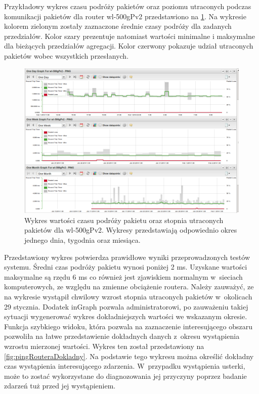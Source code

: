 Przykładowy wykres czasu podróży pakietów oraz poziomu utraconych
podczas komunikacji pakietów dla router wl-500gPv2 przedstawiono na
\ref{fig:pingRoutera}. Na wykresie kolorem zielonym zostały zaznaczone
średnie czasy podróży dla zadanych przedziałów. Kolor szary prezentuje
natomiast wartości minimalne i maksymalne dla bieżących przedziałów
agregacji. Kolor czerwony pokazuje udział utraconych pakietów wobec
wszystkich przesłanych.

\begin{figure}[ht]
  \caption{Wykres wartości czasu podróży pakietu oraz stopnia
    utraconych pakietów dla wl-500gPv2. Wykresy przedstawiają
    odpowiednio okres jednego dnia, tygodnia oraz miesiąca.}
  \label{fig:pingRoutera}
  \centering
\includegraphics[width=1\textwidth]{img/pingRoutera.png}
\end{figure}

Przedstawiony wykres potwierdza prawidłowe wyniki przeprowadzonych
testów systemu. Średni czas podróży pakietu wynosi poniżej 2
ms. Uzyskane wartości maksymalne są rzędu 6 ms co również jest
zjawiskiem normalnym w~sieciach komputerowych, ze względu na zmienne
obciążenie routera. Należy zauważyć, ze na wykresie wystąpił chwilowy
wzrost stopnia utraconych pakietów w~okolicach 29 stycznia. Dodatek
inGraph pozwala administratorowi, po zauważeniu takiej sytuacji
wygenerować wykres dokładniejszych wartości we wskazanym
okresie. Funkcja szybkiego widoku, która pozwala na zaznaczenie
interesującego obszaru pozwoliła na łatwe przedstawienie dokładnych
danych z~okresu wystąpienia wzrostu mierzonej wartości. Wykres ten
został przedstawiony na \ref{fig:pingRouteraDokladny}. Na podstawie
tego wykresu można określić dokładny czas wystąpienia interesującego
zdarzenia. W~przypadku wystąpienia usterki, może to zostać
wykorzystane do diagnozowania jej przyczyny poprzez badanie zdarzeń
tuż przed jej wystąpieniem.

